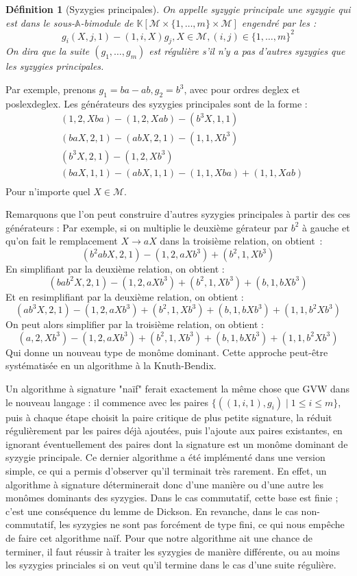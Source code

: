\documentclass{article}
\newtheorem*{dfn}{Définition}
\newcommand{\K}{\mathbb{K}}
\newcommand{\A}{\mathbb{A}}
\newcommand{\M}{\mathcal{M}}
\newcommand{\CR}{\K[\M\times\{1, \dots, m\}\times\M]}
\begin{document}
\begin{dfn}[Syzygies principales]
	On appelle syzygie principale une syzygie qui est dans le sous-$\A$-bimodule de $\CR$ engendré par les :
	$$g_i(X, j, 1) - (1, i, X)g_j, X \in \M, (i, j) \in \{1, \dots, m\}^2$$
	On dira que la suite $(g_1, \dots, g_m)$ est régulière s'il n'y a pas d'autres syzygies que les syzygies principales.
	
\end{dfn}

Par exemple, prenons $g_1 = ba - ab, g_2 = b^3$, avec pour ordres deglex et poslexdeglex.
Les générateurs des syzygies principales sont de la forme :
\begin{align*}
& (1, 2, Xba) - (1, 2, Xab) - (b^3X, 1, 1) \\
& (baX, 2, 1) - (abX, 2, 1) - (1, 1, Xb^3) \\
& (b^3X, 2, 1) - (1, 2, Xb^3) \\
& (baX, 1, 1) - (abX, 1, 1) - (1, 1, Xba) + (1, 1, Xab) \\
\end{align*}
Pour n'importe quel $X \in \M$.

Remarquons que l'on peut construire d'autres syzygies principales à partir des ces générateurs :
Par exemple, si on multiplie le deuxième gérateur par $b^2$ à gauche et qu'on fait le remplacement $X \rightarrow aX$ dans la troisième relation, on obtient~:
$$(b^2abX, 2, 1) - (1, 2, aXb^3) + (b^2, 1, Xb^3) $$
En simplifiant par la deuxième relation, on obtient :
$$(bab^2X, 2, 1) - (1, 2, aXb^3) + (b^2, 1, Xb^3) + (b, 1, bXb^3)$$
Et en resimplifiant par la deuxième relation, on obtient :
$$(ab^3X, 2, 1) - (1, 2, aXb^3) + (b^2, 1, Xb^3) + (b, 1, bXb^3) + (1, 1, b^2Xb^3)$$
On peut alors simplifier par la troisième relation, on obtient :
$$(a, 2, Xb^3) - (1, 2, aXb^3) + (b^2, 1, Xb^3) + (b, 1, bXb^3) + (1, 1, b^2Xb^3)$$
Qui donne un nouveau type de monôme dominant. Cette approche peut-être systématisée en un algorithme à la Knuth-Bendix.

Un algorithme à signature "naïf" ferait exactement la même chose que GVW dans le nouveau langage :
il commence avec les paires $\{((1, i, 1), g_i) \;|\; 1 \leq i \leq m\}$, puis à chaque étape choisit la paire critique de plus petite signature, la réduit régulièrement par les paires déjà ajoutées, puis l'ajoute aux paires existantes, en ignorant éventuellement des paires dont la signature est un monôme dominant de syzygie principale. Ce dernier algorithme a été implémenté dans une version simple, ce qui a permis d'observer qu'il terminait très rarement.
En effet, un algorithme à signature déterminerait donc d'une manière ou d'une autre les monômes dominants des syzygies. Dans le cas commutatif, cette base est finie ; c'est une conséquence du lemme de Dickson.
En revanche, dans le cas non-commutatif, les syzygies ne sont pas forcément de type fini, ce qui nous empêche de faire cet algorithme naïf. Pour que notre algorithme ait une chance de terminer, il faut réussir à traiter les syzygies de manière différente, ou au moins les syzygies princiales si on veut qu'il termine dans le cas d'une suite régulière.
\end{document}
